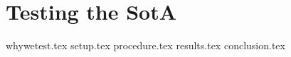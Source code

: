 \chapter{Testing the SotA}\label{sec:sota_test}
{whywetest.tex}
{setup.tex}
{procedure.tex}
{results.tex}
{conclusion.tex}

